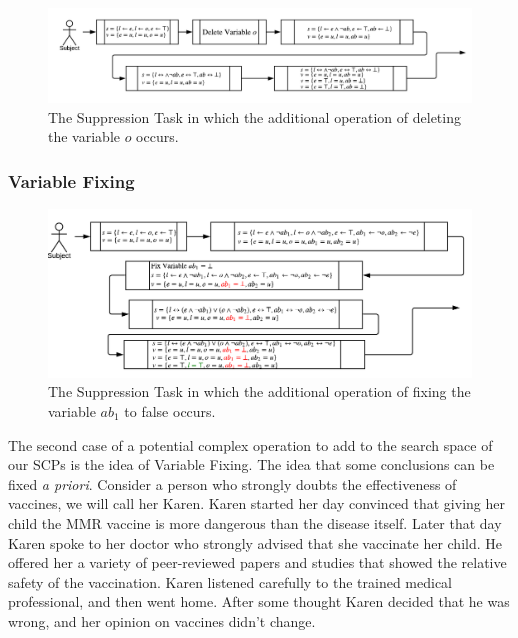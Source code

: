 \documentclass{article}
\begin{document}
\begin{figure}
\begin{center}
\includegraphics[scale=0.7]{suppressionSCP_mod}
\end{center}

\caption{The Suppression Task in which the additional operation of deleting the variable $o$ occurs.}
\label{fig:supmod}
\end{figure}

\subsubsection*{Variable Fixing}

\begin{figure}
\begin{center}
\includegraphics[scale=0.7]{suppressionSCP_mod2}
\end{center}

\caption{The Suppression Task in which the additional operation of fixing the variable $ab_1$ to false occurs.}
\label{fig:supmod2}
\end{figure}

The second case of a potential complex operation to add to the search space of our SCPs is the idea of Variable Fixing. The idea that some  conclusions can be fixed \textit{a priori}. Consider a person who strongly doubts the effectiveness of vaccines, we will call her Karen. Karen started her day convinced that giving her child the MMR vaccine is more dangerous than the disease itself. Later that day Karen spoke to her doctor who strongly advised that she vaccinate her child. He offered her a variety of peer-reviewed papers and studies that showed the relative safety of the vaccination. Karen listened carefully to the trained medical professional, and then went home. After some thought Karen decided that he was wrong, and her opinion on vaccines didn't change.
\end{document}

